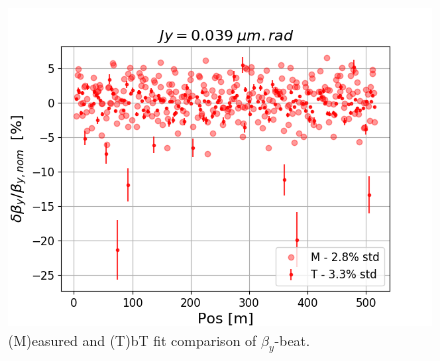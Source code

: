 \documentclass[a4paper,
               keeplastbox,   %
               ]{jacow}
\begin{document}
\begin{figure}[!htb]
  \centering
  \includegraphics*[width=.7\columnwidth]{TUPAB219_fig3.png}
  \caption{(M)easured and (T)bT fit comparison of $\beta_y$-beat.}
  \label{fig:betay}
\end{figure}
\end{document}
